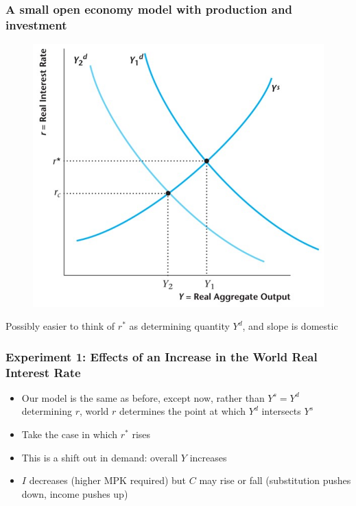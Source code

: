 \documentclass{beamer}
\begin{document}
\begin{frame}
\frametitle[alignment=center]{A small open economy model with production and investment}
\begin{figure}
\centering
\includegraphics[scale=0.55]{Figures/W_Fig_16pt7.png}
\end{figure}
Possibly easier to think of $r^*$ as determining quantity $Y^d$, and slope is domestic
\end{frame}

\begin{frame}
\frametitle[alignment=center]{Experiment 1: Effects of an Increase in the World Real Interest Rate}
\begin{itemize}
\item Our model is the same as before, except now, rather than $Y^s=Y^d$ determining $r$, world $r$ determines the point at which $Y^d$ intersects $Y^s$ 
\bigskip
\item Take the case in which $r^*$ rises
\bigskip
\item This is a shift out in demand: overall $Y$ increases
\bigskip
\item $I$ decreases (higher MPK required) but $C$ may rise or fall (substitution pushes down, income pushes up)
\end{itemize}
\end{frame}
\end{document}

